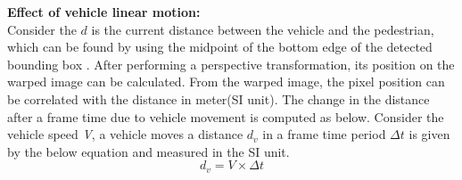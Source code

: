 






\textbf{Effect of vehicle linear motion:} \\
Consider the $d$ is the current distance between the vehicle and the pedestrian, which can be found by using the midpoint of the bottom edge of the detected bounding box \cite{CarND-Advanced-Lane}. After performing a perspective transformation, its position on the warped image can be calculated. From the warped image, the pixel position can be correlated with the distance in meter(SI unit). The change in the distance after a frame time due to vehicle movement is computed as below. Consider the vehicle speed \textit{V}, a vehicle moves a distance $d_v$ in a frame time period $\Delta t$ is given by the below equation and measured in the SI unit.
\begin{equation} \label{distance-in-pixel}
{d_v}= V \times \Delta t
\end{equation} 


